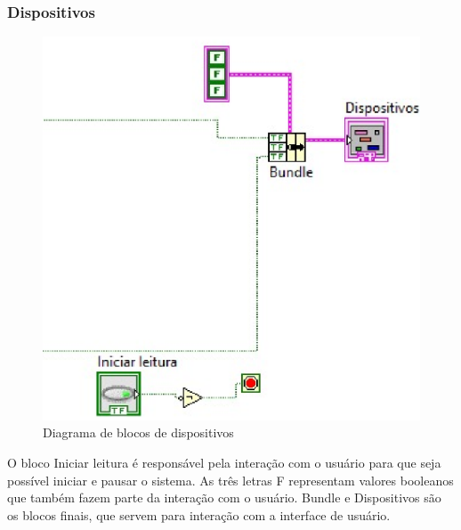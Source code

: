 \subsubsection{Dispositivos}

\begin{figure}[!htb]                                                               
    \centering                                                                      
    \includegraphics[scale=0.4, keepaspectratio=true]{figuras/detalhado/_bundle.eps} 
    \caption{Diagrama de blocos de dispositivos}
 \end{figure}

O bloco Iniciar leitura é responsável pela interação com o usuário para que seja possível iniciar e pausar o sistema. As três letras F representam valores booleanos que também fazem parte da interação com o usuário.
    Bundle e Dispositivos são os blocos finais, que servem para interação com a interface de usuário.

